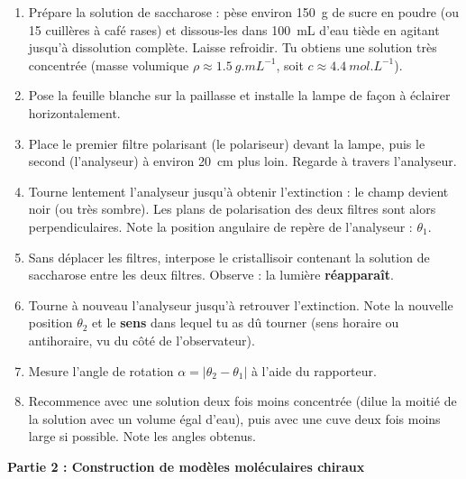 \documentclass[11pt]{article}
\newcommand{\cle}[1]{{\popxbold\color{popdark}#1}}
\begin{document}
\begin{enumerate}
\item Prépare la solution de saccharose : pèse environ \SI{150}{g} de sucre en poudre (ou 15 cuillères à café rases) et dissous-les dans \SI{100}{mL} d'eau tiède en agitant jusqu'à dissolution complète. Laisse refroidir. Tu obtiens une solution très concentrée (masse volumique $\rho \approx \SI{1,5}{g.mL^{-1}}$, soit $c \approx \SI{4,4}{mol.L^{-1}}$).
\item Pose la feuille blanche sur la paillasse et installe la lampe de façon à éclairer horizontalement.
\item Place le premier filtre polarisant (le \cle{polariseur}) devant la lampe, puis le second (l'\cle{analyseur}) à environ \SI{20}{cm} plus loin. Regarde à travers l'analyseur.
\item Tourne lentement l'analyseur jusqu'à obtenir l'\cle{extinction} : le champ devient noir (ou très sombre). Les plans de polarisation des deux filtres sont alors perpendiculaires. Note la position angulaire de repère de l'analyseur : $\theta_1$.
\item Sans déplacer les filtres, interpose le cristallisoir contenant la solution de saccharose entre les deux filtres. Observe : la lumière \textbf{réapparaît}.
\item Tourne à nouveau l'analyseur jusqu'à retrouver l'extinction. Note la nouvelle position $\theta_2$ et le \textbf{sens} dans lequel tu as dû tourner (sens horaire ou antihoraire, vu du côté de l'observateur).
\item Mesure l'angle de rotation $\alpha = |\theta_2 - \theta_1|$ à l'aide du rapporteur.
\item Recommence avec une solution deux fois moins concentrée (dilue la moitié de la solution avec un volume égal d'eau), puis avec une cuve deux fois moins large si possible. Note les angles obtenus.
\end{enumerate}

\textbf{Partie 2 : Construction de modèles moléculaires chiraux}
\end{document}
